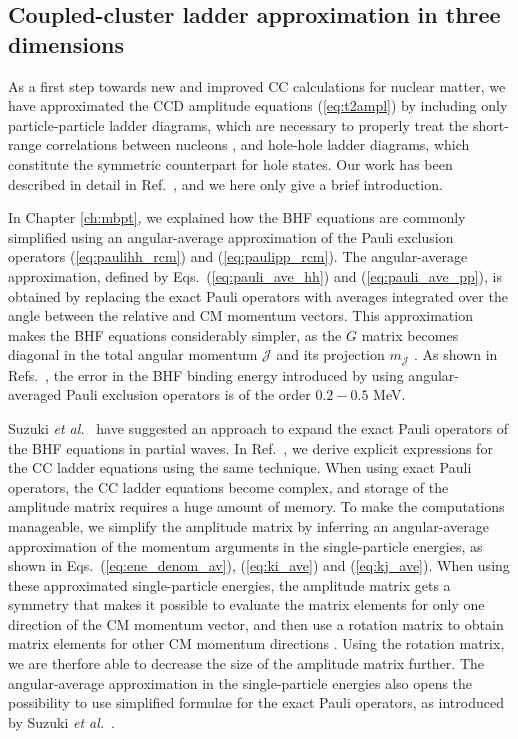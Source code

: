 \documentclass[a4paper,12pt]{report}
\begin{document}
\subsection{Coupled-cluster ladder approximation in three dimensions}

As a first step towards new and improved CC calculations for nuclear 
matter, we have approximated the CCD amplitude equations (\ref{eq:t2ampl}) 
by including only particle-particle ladder diagrams, which are 
necessary to properly treat the short-range correlations between 
nucleons \cite{dickhoff2004,brueckner1954}, and hole-hole 
ladder diagrams, which constitute the symmetric counterpart 
for hole states. Our work has been described in detail in 
Ref.~\cite{baardsen}, and we here only give a brief introduction. 

In Chapter \ref{ch:mbpt}, we explained how the BHF equations are commonly
simplified using an angular-average approximation of the Pauli exclusion 
operators (\ref{eq:paulihh_rcm}) and (\ref{eq:paulipp_rcm}). The 
angular-average approximation, defined by Eqs.~(\ref{eq:pauli_ave_hh})
and (\ref{eq:pauli_ave_pp}), is obtained by replacing the exact Pauli 
operators with averages integrated over the angle between the relative 
and CM momentum vectors. This approximation makes the BHF equations 
considerably simpler, as the $G$ matrix becomes diagonal in the 
total angular momentum $\mathcal{J}$ and its projection $m_{\mathcal{J}}$ 
\cite{suzuki}. As shown in Refs.~\cite{suzuki,schiller},
the error in the BHF binding energy introduced by using angular-averaged 
Pauli exclusion operators is of the order $0.2-0.5$ MeV.

Suzuki \emph{et al.}~\cite{suzuki} have suggested an approach to
expand the exact Pauli operators of the BHF equations in partial waves. 
In Ref.~\cite{baardsen}, we derive explicit expressions for the CC 
ladder equations using the same technique. When using exact Pauli operators,
the CC ladder equations become complex, and storage of the amplitude matrix 
requires a huge amount of memory. To make the computations manageable,
we simplify the amplitude matrix by inferring an angular-average
approximation of the momentum arguments in the single-particle
energies, as shown in Eqs.~(\ref{eq:ene_denom_av}), (\ref{eq:ki_ave}) 
and (\ref{eq:kj_ave}). When using these approximated single-particle 
energies, the amplitude matrix gets a symmetry that makes it possible
to evaluate the matrix elements for only one direction of the 
CM momentum vector, and then use a rotation matrix to obtain
matrix elements for other CM momentum directions \cite{suzuki,baardsen}. 
Using the rotation matrix, we are therfore able to decrease the size
of the amplitude matrix further. The angular-average approximation
in the single-particle energies also opens the possibility
to use simplified formulae for the exact Pauli operators,
as introduced by Suzuki \emph{et al.}~\cite{suzuki}.
\end{document}
